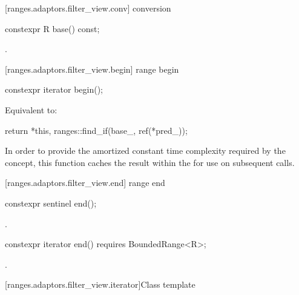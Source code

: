 [ranges.adaptors.filter_view.conv]{ conversion}

%
\begin{itemdecl}
constexpr R base() const;
\end{itemdecl}

\begin{itemdescr}
\pnum
\returns {}.
\end{itemdescr}

[ranges.adaptors.filter_view.begin]{ range begin}

%
\begin{itemdecl}
constexpr iterator begin();
\end{itemdecl}

\begin{itemdescr}
\pnum
\effects Equivalent to:
\begin{codeblock}
return {*this, ranges::find_if(base_, ref(*pred_))};
\end{codeblock}

\pnum
\remarks In order to provide the amortized constant time complexity required by
the  concept, this function caches the result within the
 for use on subsequent calls.
\end{itemdescr}

[ranges.adaptors.filter_view.end]{ range end}

%
\begin{itemdecl}
constexpr sentinel end();
\end{itemdecl}

\begin{itemdescr}
\pnum
\returns {}.
\end{itemdescr}

\begin{itemdecl}
constexpr iterator end() requires BoundedRange<R>;
\end{itemdecl}

\begin{itemdescr}
\pnum
\returns {}.
\end{itemdescr}

[ranges.adaptors.filter_view.iterator]{Class template }


